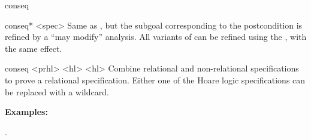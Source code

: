 \begin{tactic}{conseq}
  \begin{tsyntax}{conseq* <spec>}
  Same as , but the subgoal corresponding to the
  postcondition is refined by a ``may modify'' analysis. All variants
  of  can be refined using the \tct{*}, with the same
  effect.
  \end{tsyntax}

  \begin{tsyntax}{conseq <prhl> <hl> <hl>}
  Combine relational and non-relational specifications to prove a
  relational specification. Either one of the Hoare logic
  specifications can be replaced with a wildcard.

  \textbf{Examples:}
  \begin{mathpar}
    {}%
    \quad{}
  \end{mathpar}
  \end{tsyntax}

  .
\end{tactic}
